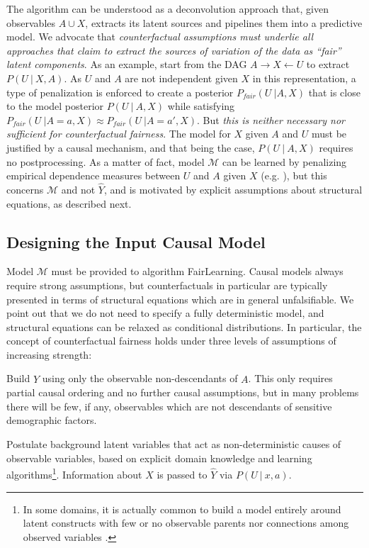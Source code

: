  The algorithm can be
understood as a deconvolution approach that, given observables $A \cup
X$, extracts its latent sources and pipelines them into a predictive
model. We advocate that \emph{counterfactual assumptions must underlie
  all approaches that claim to extract the sources of variation of the
  data as ``fair'' latent components}. As an example,
\citet{louizos2015variational} start from the DAG $A \rightarrow X
\leftarrow U$ to extract $P(U\ |\ X, A)$. As $U$ and $A$ are not
independent given $X$ in this representation, a type of penalization
is enforced to create a posterior $P_{fair}(U\ | A, X)$ that is close
to the model posterior $P(U\ |\ A, X)$ while satisfying $P_{fair}(U\ |
A = a, X) \approx P_{fair}(U\ | A = a', X)$. But {\it this is neither
  necessary nor sufficient for counterfactual fairness}. The model for
$X$ given $A$ and $U$ must be justified by a causal mechanism, and
that being the case, $P(U\ |\ A, X)$ requires no postprocessing. As a
matter of fact, model $\mathcal M$ can be learned by penalizing
empirical dependence measures between $U$ and $A$ given $X$
(e.g. \citet{mooij:09}), but this concerns $\mathcal M$ and not $\hat Y$,
and is motivated by explicit assumptions about structural equations,
as described next.

\subsection{Designing the Input Causal Model}
\label{sec:limit-guide-model}

Model $\mathcal M$ must be provided to algorithm {\sc FairLearning}.
Causal models always require strong assumptions, but counterfactuals
in particular are typically presented in terms of structural equations
which are in general unfalsifiable. We point out that we do not need
to specify a fully deterministic model, and structural equations can
be relaxed as conditional distributions. In particular, the concept of
counterfactual fairness holds under three levels of assumptions of
increasing strength:

  Build $\hat Y$ using only the observable
non-descendants of $A$.  This only requires partial causal ordering
and no further causal assumptions, but in many problems there will be
few, if any, observables which are not descendants of sensitive
demographic factors.
  
 Postulate background latent variables that
act as non-deterministic causes of observable variables, based on
explicit domain knowledge and learning algorithms\footnote{In some
  domains, it is actually common to build a model entirely around
  latent constructs with few or no observable parents nor connections
  among observed variables \citep{bol:89}.}. Information about $X$ is
passed to $\hat Y$ via $P(U\ |\ x, a)$.

